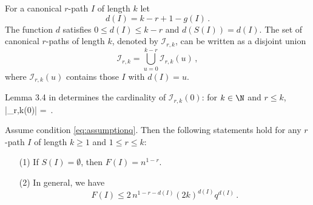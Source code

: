 For a canonical $r$-path $I$ of length $k$ let 
\begin{equation}\label{eq:defdr}
d(I)= k-r+1-g(I)\,.
\end{equation}
The function $d$ satisfies $0\le d(I) \le k-r$ and $d(S(I))=d(I)$.
The set of canonical $r$-paths of length $k$, denoted by $\mathcal{I}_{r,k}$, can be written as a disjoint union
\begin{equation*}
\mathcal{I}_{r,k}= \bigcup_{u=0}^{k-r} \mathcal{I}_{r,k}(u)\,,
\end{equation*} 
where $\mathcal{I}_{r,k}(u)$ contains those $I$ with $d(I)=u$.
\par
Lemma 3.4 in \cite{bai:silverstein:2010} determines the cardinality of $\mathcal{I}_{r,k}(0)$:
for $k\in \N$ and $r\le k$, 
\beam\label{lem:lemma3.4}
|_{r,k}(0)| =   \,.
\eeam
\begin{proposition}\label{prop:paths} Assume condition \eqref{eq:assumptionq}. Then the following statements hold for any 
$r$-path $I$ of length $k\ge 1$ and $1\le r\le k$: 
\begin{itemize}
\item[(1)] If $S(I)=\emptyset$, then $F(I)= n^{1-r}$.
\item[(2)] In general, we have 
\begin{equation}\label{eq:proppaths}
F(I)\le 2 \, n^{1-r-d(I)} (2k)^{d(I)} q^{d(I)}\,.
\end{equation}
\end{itemize}
\end{proposition}

